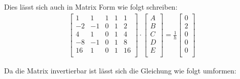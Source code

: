 Dies lässt sich auch in Matrix Form wie folgt schreiben:
\begin{align}
\begin{bmatrix}
1 & 1 & 1 & 1 & 1 \\
-2 & -1 & 0 & 1 & 2 \\
4 & 1 & 0 & 1 & 4 \\
-8 & -1 & 0 & 1 & 8 \\
16 & 1 & 0 & 1 & 16 \\
\end{bmatrix}
\cdot
\begin{bmatrix}
A \\
B \\
C \\
D \\
E \\
\end{bmatrix}
= \frac{1}{h} 
\begin{bmatrix}
0 \\
2 \\
0 \\
0 \\
0 \\
\end{bmatrix}
\end{align}

Da die Matrix invertierbar ist lässt sich die Gleichung wie folgt umformen:

